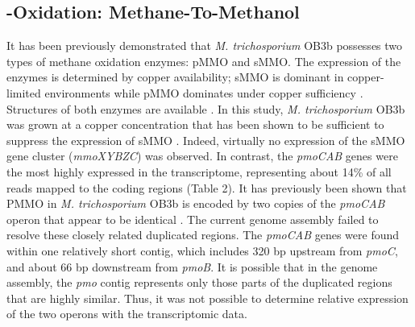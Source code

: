 \subsection{-Oxidation: Methane-To-Methanol}
It has been previously demonstrated that \textit{M. trichosporium} OB3b possesses two types of methane oxidation enzymes: pMMO and sMMO.
The expression of the enzymes is determined by copper availability; sMMO is dominant in copper-limited environments while pMMO dominates under copper sufficiency \cite{hakemian2007, semrau2010}.
Structures of both enzymes are available \cite{elango1997, hakemian2008}.
In this study, \textit{M. trichosporium} OB3b was grown at a copper concentration that has been shown to be sufficient to suppress the expression of sMMO \cite{park1991, phelps1992, nielsen1997, lloyd1999, murrell2000}.
Indeed, virtually no expression of the sMMO gene cluster (\textit{mmoXYBZC}) was observed.
In contrast, the \textit{pmoCAB} genes were the most highly expressed in the transcriptome, representing about 14\% of all reads mapped to the coding regions (Table 2).
It has previously been shown that PMMO in \textit{M. trichosporium} OB3b is encoded by two copies of the \textit{pmoCAB} operon that appear to be identical \cite{gilbert2000}.
The current genome assembly failed to resolve these closely related duplicated regions.
The \textit{pmoCAB} genes were found within one relatively short contig, which includes 320 bp upstream from \textit{pmoC}, and about 66 bp downstream from \textit{pmoB}.
It is possible that in the genome assembly, the \textit{pmo} contig represents only those parts of the duplicated regions that are highly similar.
Thus, it was not possible to determine relative expression of the two operons with the transcriptomic data.


